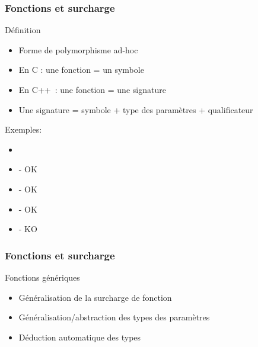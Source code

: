 \documentclass[svgnames]{beamer}
\providecommand{\cpp}[1][~]{\textsc{C++}#1}
\begin{document}
\frame
{
  \frametitle{Fonctions et surcharge}
  \begin{block}{Définition}
  \begin{itemize}\footnotesize
  \item Forme de polymorphisme ad-hoc
  \item En C : une fonction = un symbole
  \item En \cpp : une fonction = une signature
  \item Une signature = symbole + type des paramètres + qualificateur
  \end{itemize}
  \end{block}

  \begin{block}{Exemples:}
  \begin{itemize}
  \item {}
  \item {} - OK
  \item {} - OK
  \item {} - OK
  \item {} - KO
  \end{itemize}
  \end{block}
}

\frame
{
  \frametitle{Fonctions et surcharge}
  \begin{block}{Fonctions génériques}
  \begin{itemize}
  \item Généralisation de la surcharge de fonction
  \item Généralisation/abstraction des types des paramètres
  \item Déduction automatique des types
  \end{itemize}
  
  \end{block}{}
}
\end{document}
